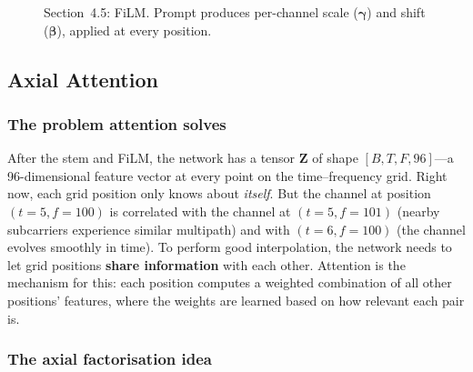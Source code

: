 \documentclass[11pt,a4paper]{article}
\begin{document}
\begin{figure}[ht!]
{%
		}
		\caption{Section~4.5: FiLM.  Prompt produces per-channel scale ($\boldsymbol{\gamma}$) and shift ($\boldsymbol{\beta}$), applied at every position.}
		\label{fig:sec45}
	\end{figure}
	
	\subsection{Axial Attention}
	
	\subsubsection*{The problem attention solves}
	
	After the stem and FiLM, the network has a tensor $\mathbf{Z}$ of shape $[B, T, F, 96]$---a 96-dimensional feature vector at every point on the time--frequency grid.  Right now, each grid position only knows about \emph{itself}.  But the channel at position $(t\!=\!5, f\!=\!100)$ is correlated with the channel at $(t\!=\!5, f\!=\!101)$ (nearby subcarriers experience similar multipath) and with $(t\!=\!6, f\!=\!100)$ (the channel evolves smoothly in time).  To perform good interpolation, the network needs to let grid positions \textbf{share information} with each other.  Attention is the mechanism for this: each position computes a weighted combination of all other positions' features, where the weights are learned based on how relevant each pair is.
	
	\subsubsection*{The axial factorisation idea}
	
\end{document}
